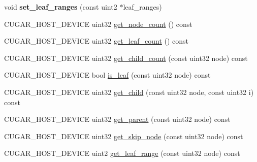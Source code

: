 \begin{DoxyCompactItemize}
\item 
\mbox{\label{structcugar_1_1_bintree__visitor_3_01_node__type_00_01leaf__index__tag_01_4_a54c695cd5232dbcd354b4274595a622e}} 
void {\bfseries set\+\_\+leaf\+\_\+ranges} (const uint2 $\ast$leaf\+\_\+ranges)
\item 
C\+U\+G\+A\+R\+\_\+\+H\+O\+S\+T\+\_\+\+D\+E\+V\+I\+CE uint32 \hyperlink{structcugar_1_1_bintree__visitor_3_01_node__type_00_01leaf__index__tag_01_4_a6442e372712a8ce43ef01c7cedc5680f}{get\+\_\+node\+\_\+count} () const
\item 
C\+U\+G\+A\+R\+\_\+\+H\+O\+S\+T\+\_\+\+D\+E\+V\+I\+CE uint32 \hyperlink{structcugar_1_1_bintree__visitor_3_01_node__type_00_01leaf__index__tag_01_4_a74923c435568b394cbbbe13ac9773d7a}{get\+\_\+leaf\+\_\+count} () const
\item 
C\+U\+G\+A\+R\+\_\+\+H\+O\+S\+T\+\_\+\+D\+E\+V\+I\+CE uint32 \hyperlink{structcugar_1_1_bintree__visitor_3_01_node__type_00_01leaf__index__tag_01_4_a4779f532c93ec1ed1e38aba2ec8bacf8}{get\+\_\+child\+\_\+count} (const uint32 node) const
\item 
C\+U\+G\+A\+R\+\_\+\+H\+O\+S\+T\+\_\+\+D\+E\+V\+I\+CE bool \hyperlink{structcugar_1_1_bintree__visitor_3_01_node__type_00_01leaf__index__tag_01_4_adf77e037fc2d9e0d31979479ddb2dced}{is\+\_\+leaf} (const uint32 node) const
\item 
C\+U\+G\+A\+R\+\_\+\+H\+O\+S\+T\+\_\+\+D\+E\+V\+I\+CE uint32 \hyperlink{structcugar_1_1_bintree__visitor_3_01_node__type_00_01leaf__index__tag_01_4_ac87db400d4946e24fcc64a70155adc9b}{get\+\_\+child} (const uint32 node, const uint32 i) const
\item 
C\+U\+G\+A\+R\+\_\+\+H\+O\+S\+T\+\_\+\+D\+E\+V\+I\+CE uint32 \hyperlink{structcugar_1_1_bintree__visitor_3_01_node__type_00_01leaf__index__tag_01_4_a5a51acea6052fafaaf99e07303e1f26b}{get\+\_\+parent} (const uint32 node) const
\item 
C\+U\+G\+A\+R\+\_\+\+H\+O\+S\+T\+\_\+\+D\+E\+V\+I\+CE uint32 \hyperlink{structcugar_1_1_bintree__visitor_3_01_node__type_00_01leaf__index__tag_01_4_a313ab9af16cf0ec5e8931d99bb25c4d3}{get\+\_\+skip\+\_\+node} (const uint32 node) const
\item 
C\+U\+G\+A\+R\+\_\+\+H\+O\+S\+T\+\_\+\+D\+E\+V\+I\+CE uint2 \hyperlink{structcugar_1_1_bintree__visitor_3_01_node__type_00_01leaf__index__tag_01_4_a7bd4921dab757ef7d482b61d7e341512}{get\+\_\+leaf\+\_\+range} (const uint32 node) const
\item 

\end{DoxyCompactItemize}
